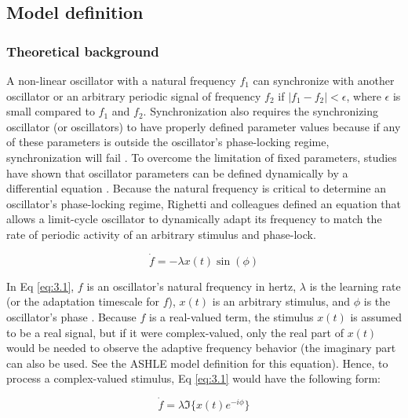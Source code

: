 \documentclass[10pt,letterpaper]{article}
\begin{document}
\subsection*{Model definition}

\subsubsection*{Theoretical background}

A non-linear oscillator with a natural frequency $f_1$ can synchronize with another oscillator or an arbitrary periodic signal of frequency $f_2$ if $|f_1 - f_2| < \epsilon$, where $\epsilon$ is small compared to $f_1$ and $f_2$. Synchronization also requires the synchronizing oscillator (or oscillators) to have properly defined parameter values because if any of these parameters is outside the oscillator's phase-locking regime, synchronization will fail \cite{righetti2006dynamic}. To overcome the limitation of fixed parameters, studies have shown that oscillator parameters can be defined dynamically by a differential equation \cite{large1994resonance, large1999dynamics, acebron1998adaptive, borisyuk2001oscillatory, ermentrout1991adaptive, nakanishi2003learning, nishii1999learning, righetti2006dynamic}. Because the natural frequency is critical to determine an oscillator's phase-locking regime, Righetti and colleagues \cite{righetti2006dynamic} defined an equation that allows a limit-cycle oscillator to dynamically adapt its frequency to match the rate of periodic activity of an arbitrary stimulus and phase-lock.

\begin{equation}
\dot{f} = -\lambda x(t) \sin(\phi) \label{eq:3.1}
\end{equation}

In Eq \eqref{eq:3.1}, $f$ is an oscillator's natural frequency in hertz, $\lambda$ is the learning rate (or the adaptation timescale for $f$), $x(t)$ is an arbitrary stimulus, and $\phi$ is the oscillator's phase \cite{righetti2006dynamic}. Because $f$ is a real-valued term, the stimulus $x(t)$ is assumed to be a real signal, but if it were complex-valued, only the real part of $x(t)$ would be needed to observe the adaptive frequency behavior (the imaginary part can also be used. See the ASHLE model definition for this equation). Hence, to process a complex-valued stimulus, Eq \eqref{eq:3.1} would have the following form:

\begin{equation}
\dot{f} = \lambda \Im \{ x(t) e^{ -i \phi} \} \label{eq:3.2}
\end{equation}
\end{document}
